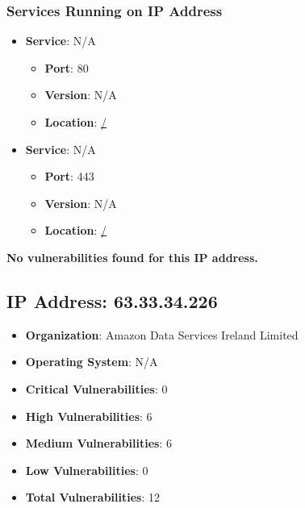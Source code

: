 \documentclass{article}
\begin{document}
\subsubsection*{Services Running on IP Address}

\begin{itemize}
    
        \item \textbf{Service}: N/A
        \begin{itemize}
            \item \textbf{Port}: 80
            \item \textbf{Version}:  N/A 
            \item \textbf{Location}: \href{ / }{ / }
        \end{itemize}
    
        \item \textbf{Service}: N/A
        \begin{itemize}
            \item \textbf{Port}: 443
            \item \textbf{Version}:  N/A 
            \item \textbf{Location}: \href{ / }{ / }
        \end{itemize}
    
\end{itemize}


\textbf{No vulnerabilities found for this IP address.}




\clearpage



\subsection{IP Address: 63.33.34.226}

\begin{itemize}
    \item \textbf{Organization}: Amazon Data Services Ireland Limited
    \item \textbf{Operating System}:  N/A 
    \item \textbf{Critical Vulnerabilities}: 0
    \item \textbf{High Vulnerabilities}: 6
    \item \textbf{Medium Vulnerabilities}: 6
    \item \textbf{Low Vulnerabilities}: 0
    \item \textbf{Total Vulnerabilities}: 12
\end{itemize}
\end{document}

